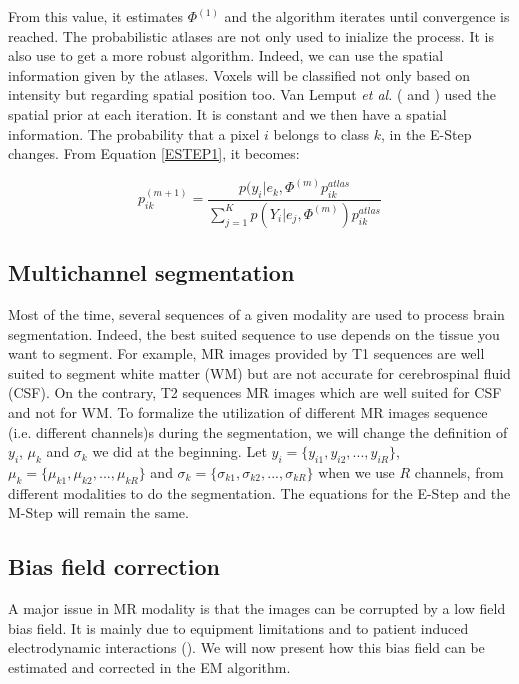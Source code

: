 From this value, it estimates $\Phi^{(1)}$ and the algorithm iterates until convergence is reached. The probabilistic atlases are not only used to inialize the process. It is also use to get a more robust algorithm. Indeed, we can use the spatial information given by the atlases. Voxels will be classified not only based on intensity but regarding spatial position too. Van Lemput \textit{et al.} (\cite{8} and \cite{9}) used the spatial prior at each iteration. It is constant and we then have a spatial information. The probability that a pixel $i$ belongs to class $k$, in the E-Step changes. From Equation \ref{ESTEP1}, it becomes:

  \begin{equation*}\label{ESTEP2}
  p_{ik}^{(m+1)} = \frac{p(y_i|e_k,\Phi^{(m)}p_{ik}^{atlas}}{\sum_{j=1}^K   p(Y_i|e_j,\Phi^{(m)}) p_{ik}^{atlas}}  
  \end{equation*}

%
\subsection{Multichannel segmentation}\label{multichannel}
Most of the time, several sequences of a given modality are used to process brain segmentation. Indeed, the best suited sequence to use depends on the tissue you want to segment. For example, MR images provided by T1 sequences \cite{12} are well suited to segment white matter (WM) but are not accurate for cerebrospinal fluid (CSF). On the contrary, T2 sequences \cite{12} MR images which are well suited for CSF and not for WM. To formalize the utilization of different MR images sequence (i.e. different channels)s during the segmentation, we will change the definition of $y_i$, $\mu_k$ and $\sigma_k$ we did at the beginning. Let $y_i = \{y_{i1},y_{i2}, ..., y_{iR}\}$, $\mu_k = \{\mu_{k1},\mu_{k2}, ..., \mu_{kR}\}$ and $\sigma_k = \{\sigma_{k1},\sigma_{k2}, ..., \sigma_{kR}\}$ when we use $R$ channels, from different modalities to do the segmentation. The equations for the E-Step and the M-Step will remain the same.
%
\subsection{Bias field correction}\label{biasfield}
A major issue in MR modality is that the images can be corrupted by a low field bias field. It is mainly due to equipment limitations and to patient induced electrodynamic interactions (\cite{12}). We will now present how this bias field can be estimated and corrected in the EM algorithm.
%
